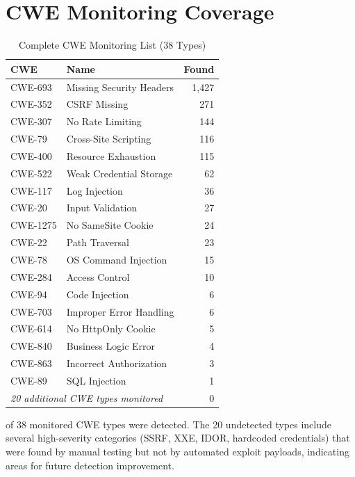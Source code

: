 \documentclass[conference,a4paper]{IEEEtran}
\begin{document}
\section{CWE Monitoring Coverage}

\begin{table}[H]
\centering
\caption{Complete CWE Monitoring List (38 Types)}
\small
\begin{tabular}{llr}
\toprule
\textbf{CWE} & \textbf{Name} & \textbf{Found} \\
\midrule
CWE-693 & Missing Security Headers & 1,427 \\
CWE-352 & CSRF Missing & 271 \\
CWE-307 & No Rate Limiting & 144 \\
CWE-79 & Cross-Site Scripting & 116 \\
CWE-400 & Resource Exhaustion & 115 \\
CWE-522 & Weak Credential Storage & 62 \\
CWE-117 & Log Injection & 36 \\
CWE-20 & Input Validation & 27 \\
CWE-1275 & No SameSite Cookie & 24 \\
CWE-22 & Path Traversal & 23 \\
CWE-78 & OS Command Injection & 15 \\
CWE-284 & Access Control & 10 \\
CWE-94 & Code Injection & 6 \\
CWE-703 & Improper Error Handling & 6 \\
CWE-614 & No HttpOnly Cookie & 5 \\
CWE-840 & Business Logic Error & 4 \\
CWE-863 & Incorrect Authorization & 3 \\
CWE-89 & SQL Injection & 1 \\
\midrule
\multicolumn{2}{l}{\emph{20 additional CWE types monitored}} & 0 \\
\bottomrule
\end{tabular}
\end{table}

 of 38 monitored CWE types were detected. The 20 undetected types include several high-severity categories (SSRF, XXE, IDOR, hardcoded credentials) that were found by manual testing but not by automated exploit payloads, indicating areas for future detection improvement.
\end{document}
